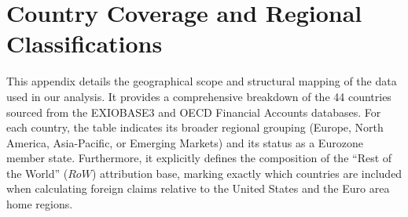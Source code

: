 \chapter{Country Coverage and Regional Classifications}
\label{Appendix C:Countries}


This appendix details the geographical scope and structural mapping of the data used in our analysis. It provides a comprehensive breakdown of the 44 countries sourced from the EXIOBASE3 and OECD Financial Accounts databases. For each country, the table indicates its broader regional grouping (Europe, North America, Asia-Pacific, or Emerging Markets) and its status as a Eurozone member state. Furthermore, it explicitly defines the composition of the ``Rest of the World'' ($RoW$) attribution base, marking exactly which countries are included when calculating foreign claims relative to the United States and the Euro area home regions.

\begingroup
\footnotesize %
\setlength{\tabcolsep}{3pt} %
\renewcommand{\arraystretch}{0.8} %

